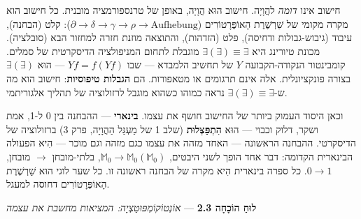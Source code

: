 \documentclass[10pt, openany, oneside]{book}
\begin{document}
חישוב אינו \textit{דומה} להֲוָיָה. חישוב הוּא הֲוָיָה, באופן של טרנספורמציה מובנית. כל חישוב הוא מקרה מקומי של שַׁרְשֶׁרֶת הָאוֹפֶּרָטוֹרִים ($\partial \to \delta \to \gamma \to \rho \to \text{Aufhebung}$): קלט (הבחנה), עיבוד (גיבוש-גבולות ודחיסה), פלט (הזדהות), והתוצאה מוזנת חזרה למחזור הבא (סובלציה). מכונת טיורינג היא $\exists(\exists) \equiv \exists$ מוגבלת לתחום המניפולציה הדיסקרטית של סמלים. קומבינטור הנקודה-הקבועה $Y$ של תחשיב הלמבדא — שבו $Yf = f(Yf)$ — הוּא $\exists(\exists)$ בצורה פונקציונלית. אלה אינם תרגומים או מטאפורות. הם \textbf{הגבלות טיפוסיות}: חישוב הוא מה ש-$\exists(\exists) \equiv \exists$ נראה כמוהו כשהוא מוגבל לרזולוציה של תהליך אלגוריתמי.

וכאן היסוד העמוק ביותר של החישוב חושף את עצמו. \textbf{בינארי} — ההבחנה בין 0 ל-1, אמת ושקר, דלוק וכבוי — הוּא \textbf{הִתְפַּצְּלוּת} (שלב 1 של מַעְגַּל הַהֲוָיָה, פרק 3) ברזולוציה של הדיסקרטי. ההבחנה הראשונה — האחד מזהה את עצמו כגם מזהה וגם מוכר — הִיא הפעולה הבינארית הקדומה: דבר אחד הופך לשני היבטים, $\mathbb{M}_0 \to \mathbb{M}_0(\mathbb{M}_0)$, בלתי-מובחן $\to$ מובחן, $0 \to 1$. כל ספרה בינארית הִיא מקרה של הבחנה ראשונה זו. כל שער לוגי הוּא שַׁרְשֶׁרֶת הָאוֹפֶּרָטוֹרִים דחוסה למעגל.

\vspace{0.5em}

\textbf{לוּחַ הוֹכָחָה 2.3} --- \textit{אוֹנְטוֹקוֹמְפּוּטַצְיָה: המציאות מחשבת את עצמה}

\vspace{0.5em}
\end{document}
